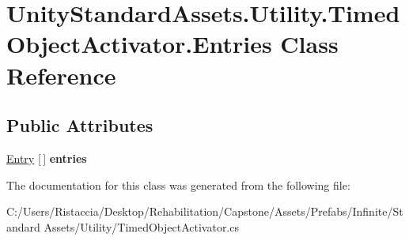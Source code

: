 \hypertarget{class_unity_standard_assets_1_1_utility_1_1_timed_object_activator_1_1_entries}{}\section{Unity\+Standard\+Assets.\+Utility.\+Timed\+Object\+Activator.\+Entries Class Reference}
\label{class_unity_standard_assets_1_1_utility_1_1_timed_object_activator_1_1_entries}
\subsection*{Public Attributes}
\begin{DoxyCompactItemize}
\item 
\mbox{\label{class_unity_standard_assets_1_1_utility_1_1_timed_object_activator_1_1_entries_aab3134611f9a35c9e3a4e63ee9feab08}} 
\hyperlink{class_unity_standard_assets_1_1_utility_1_1_timed_object_activator_1_1_entry}{Entry} \mbox{[}$\,$\mbox{]} {\bfseries entries}
\end{DoxyCompactItemize}


The documentation for this class was generated from the following file\+:\begin{DoxyCompactItemize}
\item 
C\+:/\+Users/\+Ristaccia/\+Desktop/\+Rehabilitation/\+Capstone/\+Assets/\+Prefabs/\+Infinite/\+Standard Assets/\+Utility/Timed\+Object\+Activator.\+cs\end{DoxyCompactItemize}
